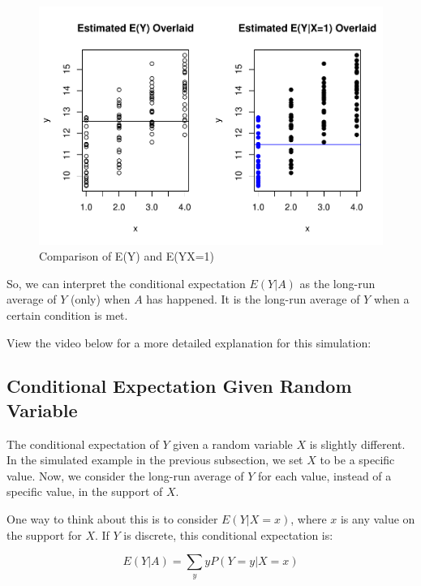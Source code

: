 \documentclass[
]{book}
\begin{document}
\begin{figure}
\centering
\includegraphics{bookdown-demo_files/figure-latex/5-condexp-1.pdf}
\caption{\label{fig:5-condexp}Comparison of E(Y) and E(Y\textbar X=1)}
\end{figure}

So, we can interpret the conditional expectation \(E(Y|A)\) as the long-run average of \(Y\) (only) when \(A\) has happened. It is the long-run average of \(Y\) when a certain condition is met.

View the video below for a more detailed explanation for this simulation:

\hypertarget{conditional-expectation-given-random-variable}{%
\subsection{Conditional Expectation Given Random Variable}\label{conditional-expectation-given-random-variable}}

The conditional expectation of \(Y\) given a random variable \(X\) is slightly different. In the simulated example in the previous subsection, we set \(X\) to be a specific value. Now, we consider the long-run average of \(Y\) for each value, instead of a specific value, in the support of \(X\).

One way to think about this is to consider \(E(Y|X=x)\), where \(x\) is any value on the support for \(X\). If \(Y\) is discrete, this conditional expectation is:

\begin{equation} 
E(Y|A) = \sum_y y P(Y=y|X=x) 
\label{eq:5-condexpdis2}
\end{equation}
\end{document}
